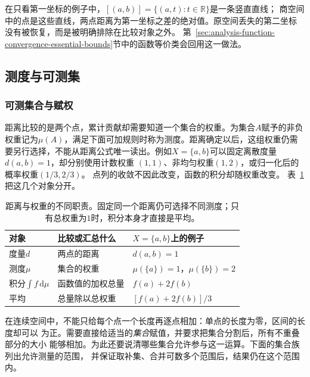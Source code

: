 在只看第一坐标的例子中，$[(a,b)]=\{(a,t):t\in\mathbb R\}$是一条竖直直线；
商空间中的点是这些直线，两点距离为第一坐标之差的绝对值。原空间丢失的第二坐标
没有被恢复，而是被明确排除在比较对象之外。
第~\ref{sec:analysis-function-convergence-essential-bounds}节中的函数等价类会回用这一做法。

\subsection{测度与可测集}
\subsubsection{可测集合与赋权}

距离比较的是两个点，累计贡献却需要知道一个集合的权重。为集合$A$赋予的非负权重记为$\mu(A)$，满足下面可加规则时称为测度。距离确定以后，这组权重仍需要另行选择，不能从距离公式唯一读出。例如$X=\{a,b\}$可以固定离散度量$d(a,b)=1$，却分别使用计数权重
$(1,1)$、非均匀权重$(1,2)$，或归一化后的概率权重$(1/3,2/3)$。
点列的收敛不因此改变，函数的积分却随权重改变。
表~\ref{tab:analysis-metric-measure-integral}把这几个对象分开。

\begin{table}[htbp]
 \centering\small
 \begin{tabularx}{\linewidth}{@{}lXX@{}}
 \toprule
 对象 & 比较或汇总什么 & $X=\{a,b\}$上的例子\\
 \midrule
 度量$d$ & 两点的距离 & $d(a,b)=1$\\
 测度$\mu$ & 集合的权重 & $\mu(\{a\})=1$，$\mu(\{b\})=2$\\
 积分$\int f\,\mathrm d\mu$ & 函数值的加权总量 & $f(a)+2f(b)$\\
 平均 & 总量除以总权重 & $[f(a)+2f(b)]/3$\\
 \bottomrule
 \end{tabularx}
 \caption{距离与权重的不同职责。固定同一个距离仍可选择不同测度；只有总权重为$1$时，积分本身才直接是平均。}
 \label{tab:analysis-metric-measure-integral}
\end{table}

在连续空间中，不能只给每个点一个长度再逐点相加：单点的长度为零，区间的长度却可以
为正。需要直接给适当的\emph{集合}赋值，并要求把集合分割后，所有不重叠部分的大小
能够相加。为此还要说清哪些集合允许参与这一运算。下面的集合族列出允许测量的范围，
并保证取补集、合并可数多个范围后，结果仍在这个范围内。

